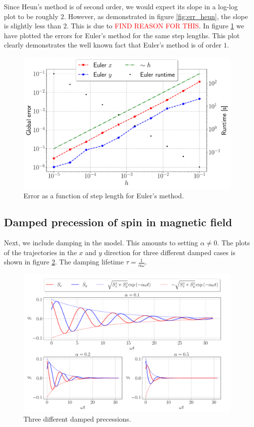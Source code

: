 Since Heun's method is of second order, we would expect its slope in a log-log plot to be roughly $2$. However, as demonstrated in figure \ref{fig:err_heun}, the slope is slightly less than $2$. This is due to \textcolor{red}{FIND REASON FOR THIS}. In figure \ref{fig:err_euler} we have plotted the errors for Euler's method for the same step lengths. This plot clearly demonstrates the well known fact that Euler's method is of order $1$.


\begin{figure}[htb]
	\centering
	\includegraphics[width = 0.8\columnwidth]{../fig/err_euler.pdf}
	\caption{Error as a function of step length for Euler's method.}
	\label{fig:err_euler}
\end{figure}

\subsection{Damped precession of spin in magnetic field}

Next, we include damping in the model. This amounts to setting $\alpha \neq 0$. The plots of the trajectories in the $x$ and $y$ direction for three different damped cases is shown in figure \ref{fig:damped}. The damping lifetime $\tau =  \frac{1}{\alpha \omega}$. 

\begin{figure}[htb]
	\centering
	\includegraphics[width=\columnwidth]{../fig/damped_precession.pdf}
	\caption{Three different damped precessions.}
	\label{fig:damped}
\end{figure}